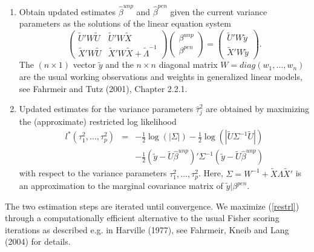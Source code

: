 \documentclass[11pt,a4paper,twoside]{bayesxarticle}
\begin{document}
\begin{enumerate}
\item Obtain updated estimates $\hat{\beta}^{unp}$ and $\hat{\beta}^{pen}$ given the current variance parameters
as the solutions of the linear equation system
\begin{equation}
\label{equsystem} \left(
\begin{array}{ll}
\tilde{U}' W  \tilde{U} & \tilde{U}' W  \tilde{X} \\
\tilde{X}' W  \tilde{U} & \tilde{X}' W  \tilde{X} +
\tilde{\Lambda}^{-1}
\end{array}
\right) \left(
\begin{array}{l}
\beta^{unp} \\
\beta^{pen}
\end{array}
\right) = \left(
\begin{array}{l}
\tilde{U}'W \tilde{y} \\
\tilde{X}'W \tilde{y}
\end{array}
\right).
\end{equation}
The $(n \times 1)$ vector $\tilde{y}$ and the $n \times n$
diagonal matrix $W = diag(w_1,\dots,w_n)$ are the usual working
observations and weights in generalized linear models, see
Fahrmeir and Tutz (2001), Chapter 2.2.1.
\item Updated estimates for the variance parameters $\hat{\tau}_j^2$ are obtained by maximizing
the (approximate) restricted log likelihood
\begin{equation}
\label{restrl}
\begin{array}{lll}
l^{\ast}(\tau^2_1,\dots,\tau^2_p) & = & -\frac{1}{2}
\log(|\Sigma|) - \frac{1}{2} \log(|\tilde{U} \Sigma^{-1}
\tilde{U}|) \\ [0.3cm] & & - \frac{1}{2} (\tilde{y} - \tilde{U}
\hat{\beta}^{unp})' \Sigma^{-1} (\tilde{y} - \tilde{U}
\hat{\beta}^{unp})
\end{array}
\end{equation}
with respect to the variance parameters $\tau^2_1,\dots,\tau^2_p$.
Here, $\Sigma = W^{-1} + \tilde{X} \Lambda \tilde{X}'$ is an
approximation to the marginal covariance matrix of $\tilde{y} |
\beta^{pen}$.
\end{enumerate}

The two estimation steps are iterated until convergence. We maximize
(\ref{restrl}) through a computationally efficient alternative to
the usual Fisher scoring iterations as described e.g. in Harville
(1977), see Fahrmeir, Kneib and Lang (2004) for details.
\end{document}
